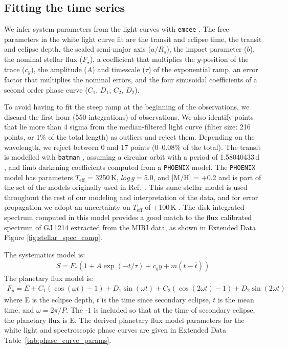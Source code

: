 \documentclass[pdflatex,sn-standardnature]{sn-jnl}%
\begin{document}
\subsection*{Fitting the time series}
We infer system parameters from the light curves with \texttt{emcee} \cite{foremanmackey13}.  The free parameters in the white light curve fit are the transit and eclipse time, the transit and eclipse depth, the scaled semi-major axis ($a/R_{s}$), the impact parameter ($b$), the nominal stellar flux ($F_\star$), a coefficient that multiplies the $y$-position of the trace ($c_y$), the amplitude ($A$) and timescale ($\tau$) of the exponential ramp, an error factor that multiplies the nominal errors, and the four sinusoidal coefficients of a second order phase curve ($C_1$, $D_1$, $C_2$, $D_2$). 

To avoid having to fit the steep ramp at the beginning of the observations, we discard the first hour (550 integrations) of observations.  We also identify points that lie more than 4 sigma from the median-filtered light curve (filter size: 216 points, or 1\% of the total length) as outliers and reject them.  Depending on the wavelength, we reject between 0 and 17 points (0--0.08\% of the total). The transit is modelled with \texttt{batman} \cite{batman}, assuming a circular orbit with a period of 1.58040433\,d \cite{cloutier21}, and limb darkening coefficients computed from a \texttt{PHOENIX} model.  The \texttt{PHOENIX} model has parameters $T_{\mathrm{eff}}$ = 3250\,K, $log\,g = 5.0$, and [M/H] = +0.2 and is part of the set of the models originally used in Ref.~\cite{kreidberg14}. This same stellar model is used throughout the rest of our modeling and interpretation of the data, and for error propagation we adopt an uncertainty on $T_{\mathrm{eff}}$ of $\pm$100\,K \cite{cloutier21}.  The disk-integrated spectrum computed in this model provides a good match to the flux calibrated spectrum of GJ\,1214 extracted from the MIRI data, as shown in Extended Data Figure \ref{fig:stellar_spec_comp}.  


The systematics model is:
\begin{align}
    S = F_* (1 + A\exp{(-t/\tau)} + c_y y + m(t-\overline{t}))
\end{align}
The planetary flux model is:
\begin{align}
    F_p = E + C_1(\cos(\omega t) - 1) + D_1 \sin(\omega t) + C_2(\cos(2\omega t) - 1) + D_2 \sin(2\omega t)
    \label{eq_flux}
\end{align}
where E is the eclipse depth, $t$ is the time since secondary eclipse, $\overline{t}$ is the mean time, and $\omega=2\pi/P$.  The -1 is included so that at the time of secondary eclipse, the planetary flux is E.  The derived planetary flux model parameters for the white light and spectroscopic phase curves are given in Extended Data Table~\ref{tab:phase_curve_params}.
\end{document}
